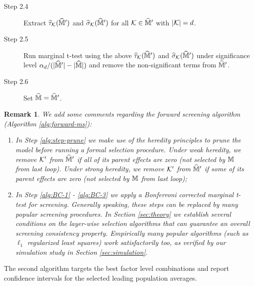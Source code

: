 \documentclass[12pt]{article}
\newtheorem{remark}{Remark}
\begin{document}
{\begin{description}
\begin{description}
\item[Step 2.4] Extract $\widehat{\tau}_{{\mathcal{K}}}(\widehat{{\mathbb{M}}}')$ and $\widehat{\sigma}_{\mathcal{K}}(\widehat{{\mathbb{M}}}')$ for all ${\mathcal{K}}\in\widehat{{\mathbb{M}}}'$ with $|{\mathcal{K}}| = d$.

\item[Step 2.5] Run marginal t-test using the above $\widehat{\tau}_{{\mathcal{K}}}(\widehat{{\mathbb{M}}}')$ and $\widehat{\sigma}_{\mathcal{K}}(\widehat{{\mathbb{M}}}')$  under significance level $\alpha_d/(|\widehat{{\mathbb{M}}}'|-|\widehat{{\mathbb{M}}}|)$ and remove the non-significant terms from $\widehat{{\mathbb{M}}}'$.

\item[Step 2.6] Set $\widehat{{\mathbb{M}}} = \widehat{{\mathbb{M}}}'$.
\end{description}
\item[END]
\end{description}
}

\begin{remark} We add some comments regarding the forward  screening algorithm (Algorithm \ref{alg:forward-ms}):
\begin{enumerate}
    \item In Step \ref{alg:step-prune} we make use of the heredity principles to prune the model before running a formal selection procedure. Under weak heredity, we remove ${\mathcal{K}}'$ from $\widehat{{\mathbb{M}}}'$ if \emph{all} of its parent effects are zero (not selected by ${\mathbb{M}}$ from last loop). Under strong heredity, we remove ${\mathcal{K}}'$ from $\widehat{{\mathbb{M}}}'$ if \emph{some} of its parent effects are zero (not selected by ${\mathbb{M}}$ from last loop);
    \item In Step \ref{alg:BC-1} - \ref{alg:BC-3} we apply a Bonferroni corrected marginal t-test for  screening. Generally speaking, these steps can be replaced by many popular  screening procedures. In Section \ref{sec:theory} we establish several conditions on the layer-wise selection algorithms that can guarantee an overall  screening consistency property. Empirically many popular algorithms (such as $\ell_1$ regularized least squares) work satisfactorily too, as verified by our simulation study in Section \ref{sec:simulation}.
\end{enumerate}
\end{remark}

The second algorithm targets the best factor level combinations and report confidence intervals for the selected leading population averages. 
\end{document}
